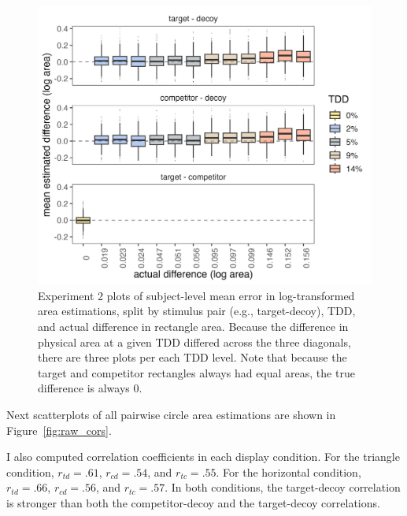 \begin{figure}
   \includegraphics[width=\textwidth]{figures/circleAreaPhase_boxplot_meanlogdiffs_no_outliers.jpeg}
   \caption{Experiment 2 plots of subject-level mean error in log-transformed area estimations, split by stimulus pair (e.g., target-decoy), TDD, and actual difference in rectangle area. Because the difference in physical area at a given TDD differed across the three diagonals, there are three plots per each TDD level. Note that because the target and competitor rectangles always had equal areas, the true difference is always 0.}
   \label{fig:circle_boxplots}
\end{figure}

Next scatterplots of all pairwise circle area estimations are shown in Figure~\ref{fig:raw_cors}. 

I also computed correlation coefficients in each display condition. For the triangle condition, $r_{td}=.61$, $r_{cd}=.54$, and $r_{tc}=.55$. For the horizontal condition, $r_{td}=.66$, $r_{cd}=.56$, and $r_{tc}=.57$. In both conditions, the target-decoy correlation is stronger than both the competitor-decoy and the target-decoy correlations. 

